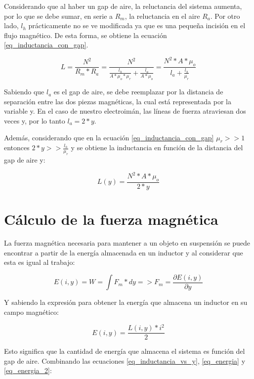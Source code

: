 Considerando que al haber un gap de aire, la reluctancia del sistema aumenta, por lo que se debe sumar, en serie a $R_{m}$, la reluctancia en el aire $R_{a}$. Por otro lado, $l_{h}$ prácticamente no se ve modificada ya que es una pequeña incisión en el flujo magnético. De esta forma, se obtiene la ecuación \ref{eq_inductancia_con_gap}.

\begin{equation}\label{eq_inductancia_con_gap}
L=\frac{N^{2}}{R_{m}*R_{a}}=\frac{N^{2}}{\frac{l_{h}}{A*\mu_{o}*\mu_{r}}+\frac{l_{a}}{A*\mu_{o}}}=\frac{N^{2}*A*\mu_{o}}{l_{a}+\frac{l_{h}}{\mu_{r}}}
\end{equation}

Sabiendo que $l_{a}$ es el gap de aire, se debe reemplazar por la distancia de separación entre las dos piezas magnéticas, la cual está representada por la variable y. En el caso de nuestro electroimán, las líneas de fuerza atraviesan dos veces y, por lo tanto $l_{a}=2*y$.

Además, considerando que en la ecuación \ref{eq_inductancia_con_gap} $\mu_{r}>>1$ entonces $2*y>>\frac{l_{h}}{\mu_{r}}$ y se obtiene la inductancia en función de la distancia del gap de aire y:

\begin{equation}\label{eq_inductancia_vs_y}
		L(y)=\frac{{N^{2}*A*\mu_{o}}}{2*y}
\end{equation}

\section{Cálculo de la fuerza magnética}

La fuerza magnética necesaria para mantener a un objeto en suspensión se puede encontrar a partir de la energía almacenada en un inductor y al considerar que esta es  igual al trabajo:

\begin{equation}\label{eq_energia}
	E(i,y)=W=\int{F_{m}*dy}=>F_{m}=\frac{\partial{E(i,y)}}{\partial{y}}
\end{equation}

Y sabiendo la expresión para obtener la energía que almacena un inductor en su campo magnético:

\begin{equation}\label{eq_energia_2}
	E(i,y)=\frac{L(i,y)*i^{2}}{2}
\end{equation}

Esto significa que la cantidad de energía que almacena el sistema es función del gap de aire. Combinando las ecuaciones \ref{eq_inductancia_vs_y}, \ref{eq_energia} y \ref{eq_energia_2}:

